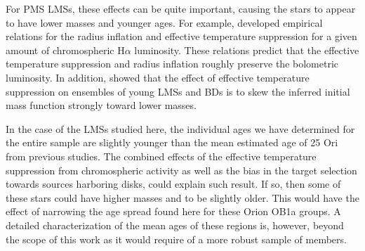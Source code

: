 \documentclass[12pt]{article}
\begin{document}
For PMS LMSs, these effects can be quite important, causing the stars to appear to have lower masses and younger ages. For example, \citet{Stassun2012} developed empirical relations for the radius inflation and effective temperature suppression for a given amount of chromospheric H$\alpha$ luminosity. These relations predict that the effective temperature suppression and radius inflation roughly preserve the bolometric luminosity. In addition, \citet{Stassun2014b} showed that the effect of effective temperature suppression on ensembles of young LMSs and BDs is to skew the inferred initial mass function strongly toward lower masses.  

In the case of the LMSs studied here, the individual ages we have determined for the entire sample are slightly younger than the mean estimated age of 25 Ori from previous studies. The combined effects of the effective temperature suppression from chromospheric activity as well as the bias in the target selection towards sources harboring disks, could explain such result. If so, then some of these stars could have higher masses and to be slightly older. This would have the effect of narrowing the age spread found here for these Orion OB1a groups. A detailed characterization of the mean ages of these regions is, however, beyond the scope of this work as it would require of a more robust sample of members.
\end{document}
